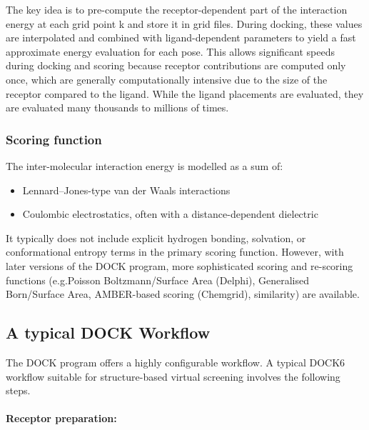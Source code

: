 \documentclass[12pt]{article}
\begin{document}
The key idea is to pre-compute the receptor-dependent part of the interaction energy at each grid point k and store it in grid files. During docking, these values are interpolated and combined with ligand-dependent parameters to yield a fast approximate energy evaluation for each pose. This allows significant speeds during docking and scoring because receptor
contributions are computed only once, which are generally computationally intensive due to the size of the receptor compared to the ligand. While the ligand placements are evaluated, they are evaluated many thousands to millions of times.

\subsubsection{Scoring function}

The inter-molecular interaction energy is modelled as a sum of:
\begin{itemize}
  \item Lennard–Jones-type van der Waals interactions
  \item Coulombic electrostatics, often with a distance-dependent dielectric
\end{itemize}

It typically does not include explicit hydrogen bonding, solvation, or conformational entropy terms in the primary scoring function\cite{CH7_Meng1992Grid}. However, with later versions of the DOCK program, more sophisticated scoring and re-scoring functions (e.g.Poisson Boltzmann/Surface Area (Delphi), Generalised Born/Surface Area, AMBER-based scoring (Chemgrid),
similarity) are available\cite{CH7_Allen2015,CH7_Brozell2012}. 


\subsection{A typical DOCK Workflow}

The DOCK program offers a highly configurable workflow. A typical DOCK6 workflow suitable for structure-based virtual screening involves the following steps\cite{CH7_Allen2015}.

\paragraph{Receptor preparation:}
\end{document}
